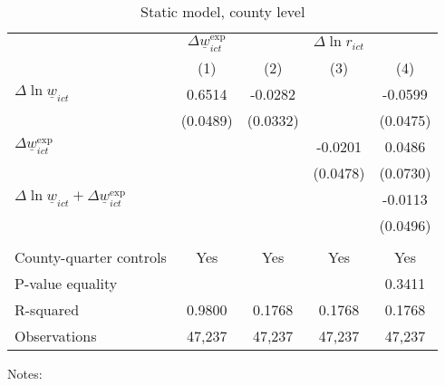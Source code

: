 \begin{table}[hbt!] \centering
    \caption{Static model, county level}
    \label{tab:static_county}

    \begin{tabular}{l*{4}{c}}
    \toprule
     & \multicolumn{1}{c}{$\Delta \underline{w}_{ict}^{\text{exp}}$}
     & \multicolumn{3}{c}{$\Delta \ln r_{ict}$}                                  \\ \cmidrule(lr){2-2}\cmidrule(lr){3-5}
     & \multicolumn{1}{c}{(1)} & \multicolumn{1}{c}{(2)} 
     & \multicolumn{1}{c}{(3)} & \multicolumn{1}{c}{(4)}                         \\ \midrule
    $\Delta \ln \underline{w}_{ict}$          &  0.6514  &  -0.0282  &       &  -0.0599     \\
                                              & (0.0489) & (0.0332) &       & (0.0475)    \\
    $\Delta \underline{w}_{ict}^{\text{exp}}$ &       &       &  -0.0201  & 0.0486      \\
                                              &       &       & (0.0478) & (0.0730)    \\ \midrule
    $\Delta \ln \underline{w}_{ict}+
      \Delta \underline{w}_{ict}^{\text{exp}}$&       &       &       &  -0.0113     \\
                                              &       &       &       & (0.0496)    \\
                                              &       &       &       &          \\ \midrule
    County-quarter controls                   &  Yes  & Yes   & Yes   & Yes      \\
    P-value equality                          &       &       &       & 0.3411      \\
    R-squared                                 &  0.9800  &  0.1768  &  0.1768  & 0.1768      \\
    Observations                              & 47,237  & 47,237  & 47,237  & 47,237     \\\bottomrule
    \end{tabular}

    \begin{minipage}{.95\textwidth} \footnotesize
        \vspace{2mm}
        Notes: 
    \end{minipage}
\end{table}
